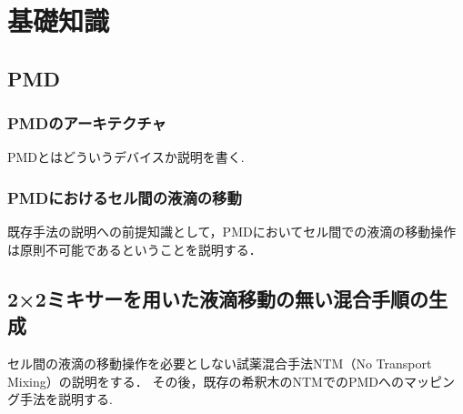 \chapter{基礎知識}
\section{PMD}
\subsection{PMDのアーキテクチャ}
PMDとはどういうデバイスか説明を書く.
\subsection{PMDにおけるセル間の液滴の移動}
既存手法の説明への前提知識として，PMDにおいてセル間での液滴の移動操作は原則不可能であるということを説明する．
\section{{2×2ミキサーを用いた液滴移動の無い混合手順の生成}}
セル間の液滴の移動操作を必要としない試薬混合手法NTM（No Transport Mixing）の説明をする．
その後，既存の希釈木のNTMでのPMDへのマッピング手法を説明する.
